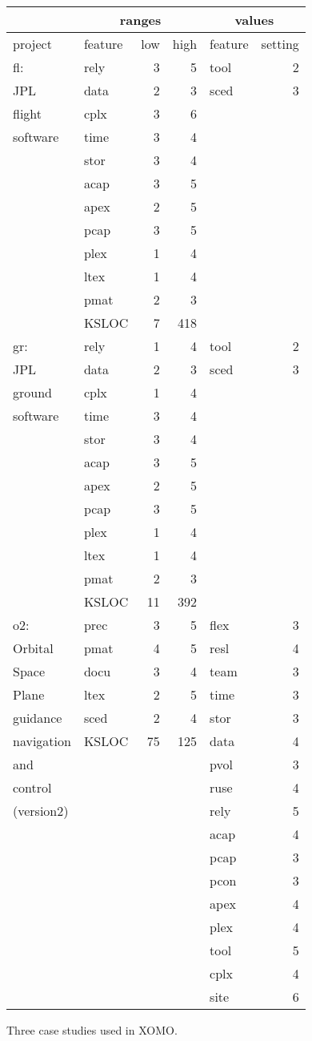 \begin{figure}
\begin{changed}
\begin{center}
\scriptsize
\begin{tabular}{l|lrr|lr}
       &\multicolumn{3}{c|}{ranges}      &\multicolumn{2}{c}{values}\\\hline
project&feature&low&high&feature&setting\\\hline


fl:&rely&3&5&tool&2\\
JPL &data&2&3&sced&3\\
flight&cplx&3&6&&\\
software&time&3&4&&\\
&stor&3&4&&\\
&acap&3&5&&\\
&apex&2&5&&\\
&pcap&3&5&&\\
&plex&1&4&&\\
&ltex&1&4&&\\
&pmat&2&3&&\\
&KSLOC&7&418&&\\\hline
gr:&rely&1&4&tool&2\\
JPL &data&2&3&sced&3\\
ground&cplx&1&4&&\\
software&time&3&4&&\\
&stor&3&4&&\\
&acap&3&5&&\\
&apex&2&5&&\\
&pcap&3&5&&\\
&plex&1&4&&\\
&ltex&1&4&&\\
&pmat&2&3&&\\
&KSLOC&11&392&&\\\hline
o2:&prec&3&5&flex&3\\
Orbital &pmat&4&5&resl&4\\
Space&docu&3&4&team&3\\
Plane&ltex&2&5&time&3\\
guidance&sced&2&4&stor&3\\
navigation&KSLOC&75&125&data&4\\
and&&&&pvol&3\\
control&&&&ruse&4\\
(version2)&&&&rely&5\\
&&&&acap&4\\
&&&&pcap&3\\
&&&&pcon&3\\
&&&&apex&4\\
&&&&plex&4\\
&&&&tool&5\\
&&&&cplx&4\\
&&&&site&6\\
\end{tabular}
\end{center}
\caption{Three case studies used in XOMO.}\label{fig:xomocases}
\end{changed}
\end{figure}
